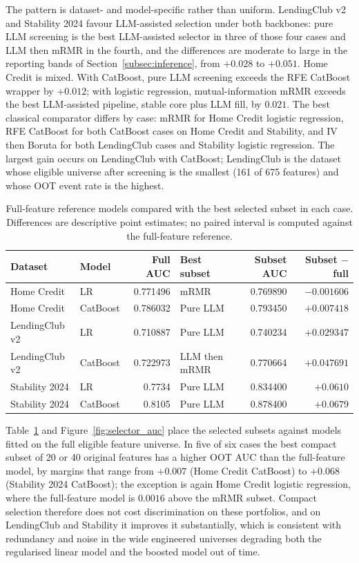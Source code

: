 \documentclass[preprint,12pt]{elsarticle}
\begin{document}
The pattern is dataset- and model-specific rather than uniform. LendingClub v2 and Stability 2024 favour LLM-assisted selection under both backbones: pure LLM screening is the best LLM-assisted selector in three of those four cases and LLM then mRMR in the fourth, and the differences are moderate to large in the reporting bands of Section~\ref{subsec:inference}, from $+0.028$ to $+0.051$. Home Credit is mixed. With CatBoost, pure LLM screening exceeds the RFE CatBoost wrapper by $+0.012$; with logistic regression, mutual-information mRMR exceeds the best LLM-assisted pipeline, stable core plus LLM fill, by $0.021$. The best classical comparator differs by case: mRMR for Home Credit logistic regression, RFE CatBoost for both CatBoost cases on Home Credit and Stability, and IV then Boruta for both LendingClub cases and Stability logistic regression. The largest gain occurs on LendingClub with CatBoost; LendingClub is the dataset whose eligible universe after screening is the smallest (161 of 675 features) and whose OOT event rate is the highest.

\begin{table}[htbp]
\centering
\scriptsize
\begin{threeparttable}
\caption{Full-feature reference models compared with the best selected subset in each case. Differences are descriptive point estimates; no paired interval is computed against the full-feature reference.}
\label{tab:full_feature}
\begin{tabular}{@{}llrlrr@{}}
\toprule
Dataset & Model & Full AUC & Best subset & Subset AUC & Subset $-$ full \\
\midrule
Home Credit & LR & 0.771496 & mRMR & 0.769890 & $-0.001606$ \\
Home Credit & CatBoost & 0.786032 & Pure LLM & 0.793450 & $+0.007418$ \\
LendingClub v2 & LR & 0.710887 & Pure LLM & 0.740234 & $+0.029347$ \\
LendingClub v2 & CatBoost & 0.722973 & LLM then mRMR & 0.770664 & $+0.047691$ \\
Stability 2024 & LR & 0.7734 & Pure LLM & 0.834400 & $+0.0610$ \\
Stability 2024 & CatBoost & 0.8105 & Pure LLM & 0.878400 & $+0.0679$ \\
\bottomrule
\end{tabular}
\end{threeparttable}
\end{table}

Table~\ref{tab:full_feature} and Figure~\ref{fig:selector_auc} place the selected subsets against models fitted on the full eligible feature universe. In five of six cases the best compact subset of 20 or 40 original features has a higher OOT AUC than the full-feature model, by margins that range from $+0.007$ (Home Credit CatBoost) to $+0.068$ (Stability 2024 CatBoost); the exception is again Home Credit logistic regression, where the full-feature model is $0.0016$ above the mRMR subset. Compact selection therefore does not cost discrimination on these portfolios, and on LendingClub and Stability it improves it substantially, which is consistent with redundancy and noise in the wide engineered universes degrading both the regularised linear model and the boosted model out of time.
\end{document}
